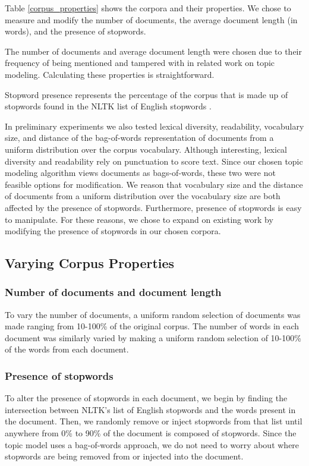 \documentclass[letterpaper, 10 pt, conference]{ieeeconf}  %
\begin{document}
Table \ref{corpus_properties} shows the corpora and their properties. We chose to measure and modify the number of documents, the average document length (in words), and the presence of stopwords.

The number of documents and average document length were chosen due to their frequency of being mentioned and tampered with in related work on topic modeling. Calculating these properties is straightforward.

Stopword presence represents the percentage of the corpus that is made up of stopwords found in the NLTK list of English stopwords \cite{NLTK}.

In preliminary experiments we also tested lexical diversity, readability, vocabulary size, and distance of the bag-of-words representation of documents from a uniform distribution over the corpus vocabulary. Although interesting, lexical diversity and readability rely on punctuation to score text. Since our chosen topic modeling algorithm views documents as bags-of-words, these two were not feasible options for modification. We reason that vocabulary size and the distance of documents from a uniform distribution over the vocabulary size are both affected by the presence of stopwords. Furthermore, presence of stopwords is easy to manipulate. For these reasons, we chose to expand on existing work by modifying the presence of stopwords in our chosen corpora.

\subsection{Varying Corpus Properties}

\subsubsection{Number of documents and document length}
To vary the number of documents, a uniform random selection of documents was made ranging from 10-100\% of the original corpus. The number of words in each document was similarly varied by making a uniform random selection of 10-100\% of the words from each document.

\subsubsection{Presence of stopwords}
To alter the presence of stopwords in each document, we begin by finding the intersection between NLTK's list of English stopwords and the words present in the document. Then, we randomly remove or inject stopwords from that list until anywhere from 0\% to 90\% of the document is composed of stopwords. Since the topic model uses a bag-of-words approach, we do not need to worry about where stopwords are being removed from or injected into the document.
\end{document}
